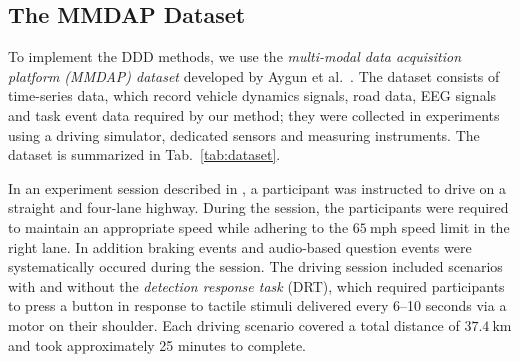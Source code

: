 \documentclass[letterpaper, 10 pt, conference]{ieeeconf}  %
\begin{document}

\subsection{The MMDAP Dataset} \label{sec:dataset}

To implement the DDD methods, we use the \emph{multi-modal data acquisition platform (MMDAP) dataset} developed by Aygun et al.~\cite{Aygun2024,Scheutz2024}.
The dataset consists of time-series data, which record vehicle dynamics signals, road data, EEG signals and task event data required by our method;
they were collected in experiments using a driving simulator, dedicated sensors and measuring instruments.
The dataset is summarized in Tab.~\ref{tab:dataset}.

%
In an experiment session described in \cite{Scheutz2024}, a participant was instructed to drive on a straight and four-lane highway.
During the session, the participants were required to maintain an appropriate speed while adhering to the $65~\mathrm{mph}$ speed limit in the right lane.
%
In addition braking events and audio-based question events were systematically occured during the session.
%
The driving session included scenarios with and without the \emph{detection response task} (DRT), which required participants to press a button in response to tactile stimuli delivered every 6–10 seconds via a motor on their shoulder.
Each driving scenario covered a total distance of $37.4~\mathrm{km}$ and took approximately 25 minutes to complete. 
%
\end{document}
